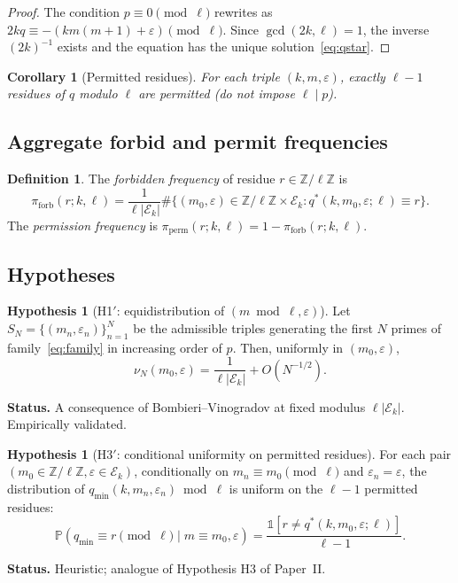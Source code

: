 \documentclass[11pt,a4paper]{article}
\theoremstyle{plain}
\newtheorem{corollary}[theorem]{Corollary}
\theoremstyle{definition}
\newtheorem{definition}[theorem]{Definition}
\newtheorem{hypothesis}[theorem]{Hypothesis}
\newcommand{\qmin}{q_{\min}}
\newcommand{\Z}{\mathbb{Z}}
\newcommand{\Prb}{\mathbb{P}}
\newcommand{\PiP}{\pi_{\mathrm{perm}}}
\newcommand{\PiF}{\pi_{\mathrm{forb}}}
\newcommand{\eps}{\varepsilon}
\newcommand{\Eclass}{\mathcal{E}}
\begin{document}
\begin{proof}
The condition $p \equiv 0 \pmod \ell$ rewrites as
$2kq \equiv -(km(m+1) + \eps) \pmod \ell$. Since $\gcd(2k, \ell) = 1$, the inverse
$(2k)^{-1}$ exists and the equation has the unique solution~\eqref{eq:qstar}.
\end{proof}

\begin{corollary}[Permitted residues]\label{cor:permitted}
For each triple $(k, m, \eps)$, exactly $\ell - 1$ residues of $q$ modulo $\ell$
are \emph{permitted} (do not impose $\ell \mid p$).
\end{corollary}

\subsection{Aggregate forbid and permit frequencies}

\begin{definition}\label{def:perm}
The \emph{forbidden frequency} of residue $r \in \Z/\ell\Z$ is
\[
\PiF(r; k, \ell) = \frac{1}{\ell |\Eclass_k|}
\#\bigl\{(m_0, \eps) \in \Z/\ell\Z \times \Eclass_k : q^*(k, m_0, \eps; \ell) \equiv r\bigr\}.
\]
The \emph{permission frequency} is $\PiP(r; k, \ell) = 1 - \PiF(r; k, \ell)$.
\end{definition}

\subsection{Hypotheses}

\begin{heuristicbox}
\begin{hypothesis}[H1$'$: equidistribution of $(m \bmod \ell, \eps)$]\label{hyp:H1prime}
Let $S_N = \{(m_n, \eps_n)\}_{n=1}^N$ be the admissible triples generating the
first $N$ primes of family~\eqref{eq:family} in increasing order of $p$. Then,
uniformly in $(m_0, \eps)$,
\[
\nu_N(m_0, \eps) = \frac{1}{\ell |\Eclass_k|} + O(N^{-1/2}).
\]
\end{hypothesis}
\textbf{Status.} A consequence of Bombieri--Vinogradov at fixed modulus
$\ell |\Eclass_k|$. Empirically validated.
\end{heuristicbox}

\begin{heuristicbox}
\begin{hypothesis}[H3$'$: conditional uniformity on permitted residues]\label{hyp:H3prime}
For each pair $(m_0 \in \Z/\ell\Z, \eps \in \Eclass_k)$, conditionally on
$m_n \equiv m_0 \pmod \ell$ and $\eps_n = \eps$, the distribution of
$\qmin(k, m_n, \eps_n) \bmod \ell$ is uniform on the $\ell-1$ permitted residues:
\[
\Prb\!\left(\qmin \equiv r \pmod \ell \mid m \equiv m_0, \eps\right)
= \frac{\mathbb{1}[r \neq q^*(k, m_0, \eps; \ell)]}{\ell - 1}.
\]
\end{hypothesis}
\textbf{Status.} Heuristic; analogue of Hypothesis H3 of Paper~II.
\end{heuristicbox}
\end{document}

